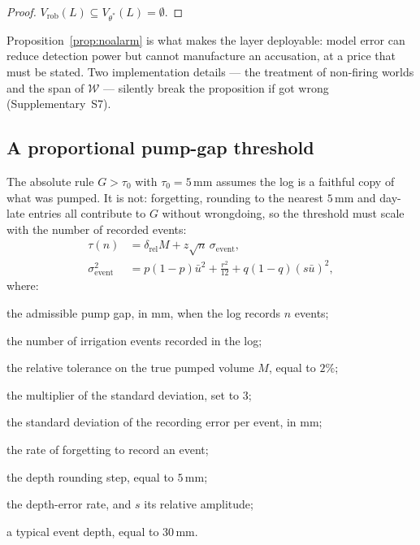 \begin{proof}
$V_{\mathrm{rob}}(L)\subseteq V_{\theta^{*}}(L)=\emptyset$.
\end{proof}

Proposition~\ref{prop:noalarm} is what makes the layer deployable: model error
can reduce detection power but cannot manufacture an accusation, at a price
that must be stated. Two implementation details --- the treatment of non-firing
worlds and the span of $\mathcal{W}$ --- silently break the proposition if got
wrong (Supplementary~S7).

\subsection{A proportional pump-gap threshold}

The absolute rule $G>\tau_0$ with $\tau_0=5$\,mm assumes the log is a
faithful copy of what was pumped. It is not: forgetting, rounding to the
nearest $5$\,mm and day-late entries all contribute to $G$ without wrongdoing,
so the threshold must scale with the number of recorded events:
\begin{equation}
\begin{aligned}
\tau(n)&=\delta_{\mathrm{rel}}M+z\sqrt{n}\,\sigma_{\mathrm{event}},\\
\sigma_{\mathrm{event}}^{2}&=p(1-p)\bar u^{2}+\tfrac{r^{2}}{12}
+q(1-q)(s\bar u)^{2},
\end{aligned}
\label{eq:tau}
\end{equation}
where:
\begin{symbolist}
\item[$\tau(n)$] the admissible pump gap, in mm, when the log records $n$ events;
\item[$n$] the number of irrigation events recorded in the log;
\item[$\delta_{\mathrm{rel}}$] the relative tolerance on the true pumped volume $M$, equal to $2\%$;
\item[$z$] the multiplier of the standard deviation, set to $3$;
\item[$\sigma_{\mathrm{event}}$] the standard deviation of the recording error per event, in mm;
\item[$p$] the rate of forgetting to record an event;
\item[$r$] the depth rounding step, equal to $5$\,mm;
\item[$q$] the depth-error rate, and $s$ its relative amplitude;
\item[$\bar u$] a typical event depth, equal to $30$\,mm.
\end{symbolist}

